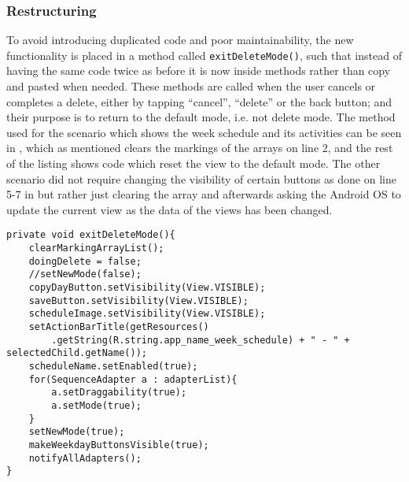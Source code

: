 \subsubsection{Restructuring}
To avoid introducing duplicated code and poor maintainability, the new functionality is placed in a method called \texttt{exitDeleteMode()}, such that instead of having the same code twice as before it is now inside methods rather than copy and pasted when needed.
These methods are called when the user cancels or completes a delete, either by tapping \enquote{cancel}, \enquote{delete} or the back button;
and their purpose is to return to the default mode, i.e. not delete mode.
The method used for the scenario which shows the week schedule and its activities can be seen in , which as mentioned clears the markings of the arrays on line 2, and the rest of the listing shows code which reset the view to the default mode.
The other scenario did not require changing the visibility of certain buttons as done on line 5-7 in  but rather just clearing the array and afterwards asking the Android OS to update the current view as the data of the views has been changed.

\begin{lstlisting}[caption={The \texttt{exitDeleteMode()} method, which returns the application to the default mode}, label={lst:exitdeletemode}]
private void exitDeleteMode(){
    clearMarkingArrayList();
    doingDelete = false;
    //setNewMode(false);
    copyDayButton.setVisibility(View.VISIBLE);
    saveButton.setVisibility(View.VISIBLE);
    scheduleImage.setVisibility(View.VISIBLE);
    setActionBarTitle(getResources()
        .getString(R.string.app_name_week_schedule) + " - " + selectedChild.getName());
    scheduleName.setEnabled(true);
    for(SequenceAdapter a : adapterList){
        a.setDraggability(true);
        a.setMode(true);
    }
    setNewMode(true);
    makeWeekdayButtonsVisible(true);
    notifyAllAdapters();
}
\end{lstlisting}
